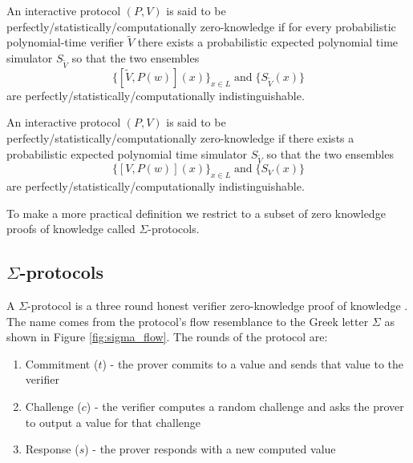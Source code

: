 \begin{defn}
  An interactive protocol $(P, V)$ is said to be
  perfectly/statistically/computationally zero-knowledge if for
  every probabilistic polynomial-time verifier $\tilde{V}$ there
  exists a probabilistic expected polynomial time simulator
  $S_{\tilde{V}}$ so that the two ensembles
  \[
  \{[\tilde{V}, P(w)](x)\}_{x \in L} \; \textrm{and} \; \{S_{\tilde{V}}(x)\}
  \]
  are perfectly/statistically/computationally indistinguishable.
\end{defn}

\begin{defn}
  An interactive protocol $(P, V)$ is said to be
  perfectly/statistically/computationally zero-knowledge if there
  exists a probabilistic expected polynomial time simulator
  $S_{\tilde{V}}$ so that the two ensembles
  \[
  \{[V, P(w)](x)\}_{x \in L} \; \textrm{and} \; \{S_V(x)\}
  \]
  are perfectly/statistically/computationally indistinguishable.
\end{defn}

To make a more practical definition we restrict to a subset of zero
knowledge proofs of knowledge called $\Sigma$-protocols.

\subsection{$\Sigma$-protocols}

A $\Sigma$-protocol is a three round honest verifier zero-knowledge
proof of knowledge \cite{cryptography_introduction}. The name comes
from the protocol's flow resemblance to the Greek letter $\Sigma$ as
shown in Figure \ref{fig:sigma_flow}. The rounds of the protocol are:
\begin{enumerate}
\item Commitment ($t$) - the prover commits to a value and sends that
  value to the verifier
\item Challenge ($c$) - the verifier computes a random challenge and asks
  the prover to output a value for that challenge
\item Response ($s$) - the prover responds with a new computed value
\end{enumerate}

